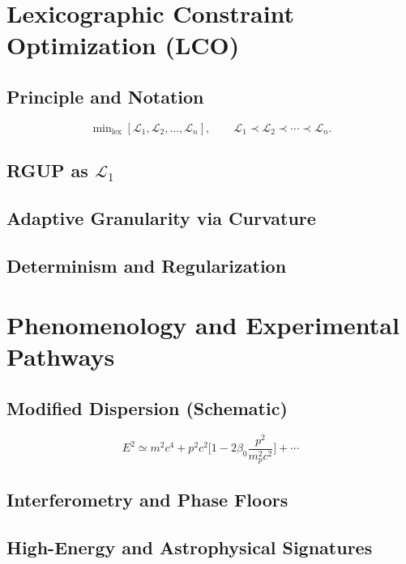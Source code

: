 \documentclass[11pt,oneside]{book}
\numberwithin{equation}{chapter}
\newcommand{\mpx}{m_p}               %
\newcommand{\betaz}{\beta_0}
\begin{document}
\chapter{Lexicographic Constraint Optimization (LCO)}
\section{Principle and Notation}
\begin{equation}
\min\nolimits_{\text{lex}}[\mathcal{L}_1,\mathcal{L}_2,\ldots,\mathcal{L}_n],\qquad
\mathcal{L}_1\prec \mathcal{L}_2\prec \cdots \prec \mathcal{L}_n.
\end{equation}
\section{RGUP as \texorpdfstring{$\mathcal{L}_1$}{L1}}
\section{Adaptive Granularity via Curvature}
\section{Determinism and Regularization}

\chapter{Phenomenology and Experimental Pathways}
\section{Modified Dispersion (Schematic)}
\begin{equation}
E^2 \simeq m^2 c^4 + p^2 c^2\Big[1 - 2\betaz \frac{p^2}{\mpx^2 c^2}\Big]+\cdots
\end{equation}
\section{Interferometry and Phase Floors}
\section{High-Energy and Astrophysical Signatures}
\end{document}
